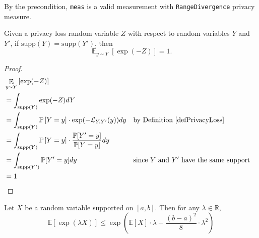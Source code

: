 \documentclass{article}
\begin{document}
\begin{theorem}[Postcondition]
    \label{postcondition}
\end{theorem}

By the precondition, \texttt{meas} is a valid measurement with \texttt{RangeDivergence} privacy measure.



\begin{lemma} 
    \label{lemma:PRV_lemma_1}
    Given a privacy loss random variable $Z$ with respect to random variables $Y$ and $Y'$,
    if $\mathrm{supp}(Y) = \mathrm{supp}(Y')$, then
    \begin{equation}
      \mathop{\mathbb{E}}_{y \sim Y}\left[\exp(-Z)\right] = 1.
    \end{equation}
\end{lemma}

\begin{proof}
    \begin{align}
        &\mathop{\mathbb{E}}_{y \sim Y}\left[\exp(-Z)\right] \\
        &= \int_{\mathrm{supp}(Y)} \exp(-Z) dY \\
        &= \int_{\mathrm{supp}(Y)} \mathbb{P}\left[Y = y\right] \cdot \exp(-\mathcal{L}_{Y, Y'}(y)) dy && \text{by Definition~} \ref{defPrivacyLoss} \\
        &= \int_{\mathrm{supp}(Y)} \mathbb{P}\left[Y = y\right] \cdot \frac{\mathbb{P}[Y' = y]}{\mathbb{P}[Y = y]} dy \\
        &= \int_{\mathrm{supp}(Y')} \mathbb{P}[Y' = y] dy && \text{since } Y \text{ and } Y' \text{ have the same support} \\
        &= 1
    \end{align}
\end{proof}

\begin{definition}
    \label{defHoeffding}
    Let $X$ be a random variable supported on $[a, b]$. Then for any $\lambda \in \mathbb{R}$,
    \begin{equation}
        \mathbb{E}\left[\exp(\lambda X)\right] \leq \exp(\mathbb{E}[X] \cdot \lambda + \frac{(b - a)^2}{8} \cdot \lambda^2)
    \end{equation}
\end{definition}
\end{document}

